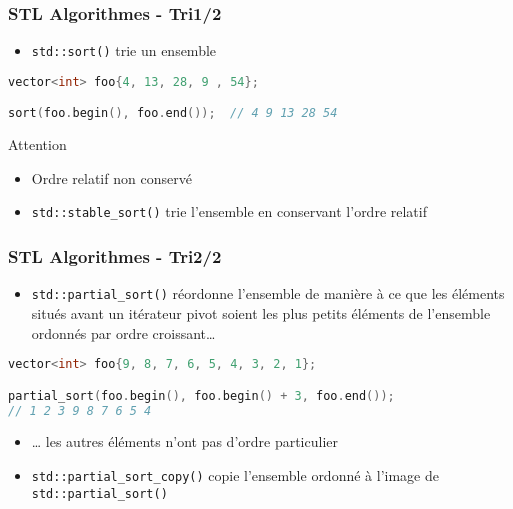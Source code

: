 \documentclass[C++.tex]{subfiles}
\begin{document}
\begin{frame}[fragile]
	\frametitle{STL Algorithmes - Tri\titlehfill{}1/2}


	\begin{itemize}
		\item \lstinline|std::sort()| trie un ensemble
	\end{itemize}

	\begin{lstlisting}[language=C++]
vector<int> foo{4, 13, 28, 9 , 54};

sort(foo.begin(), foo.end());  // 4 9 13 28 54\end{lstlisting}

	\begin{alertblock}{Attention}
		\begin{itemize}
			\item Ordre relatif non conservé
		\end{itemize}

	\end{alertblock}

	\begin{itemize}
		\item \lstinline|std::stable_sort()| trie l'ensemble en conservant l'ordre relatif
	\end{itemize}
\end{frame}

\begin{frame}[fragile]
	\frametitle{STL Algorithmes - Tri\titlehfill{}2/2}
	\begin{itemize}
		\item \lstinline|std::partial_sort()| réordonne l'ensemble de manière à ce que les éléments situés avant un itérateur pivot soient les plus petits éléments de l'ensemble ordonnés par ordre croissant\ldots
	\end{itemize}

	\begin{lstlisting}[language=C++]
vector<int> foo{9, 8, 7, 6, 5, 4, 3, 2, 1};

partial_sort(foo.begin(), foo.begin() + 3, foo.end());
// 1 2 3 9 8 7 6 5 4\end{lstlisting}

	\begin{itemize}
		\item \ldots{} les autres éléments n'ont pas d'ordre particulier
		\item \lstinline|std::partial_sort_copy()| copie l'ensemble ordonné à l'image de \lstinline|std::partial_sort()|
	\end{itemize}
\end{frame}
\end{document}
